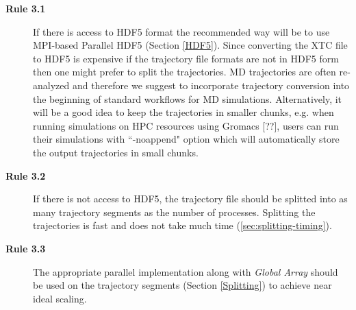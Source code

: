 \begin{description}
\begin{description}
  \item[\textbf{Rule 3.1}] If there is access to HDF5 format the recommended way will be to use MPI-based Parallel HDF5 (Section \ref{HDF5}). Since converting the XTC file to HDF5 is expensive if the trajectory file formats are not in HDF5 form then one might prefer to split the trajectories. MD trajectories are often re-analyzed and therefore we suggest to incorporate trajectory conversion into the beginning of standard workflows for MD simulations. 
 Alternatively, it will be a good idea to keep the trajectories in smaller chunks, e.g. when running simulations on HPC resources using Gromacs [??], users can run their simulations with ``-noappend" option which will automatically store the output trajectories in small chunks.
  \item[\textbf{Rule 3.2}] If there is not access to HDF5, the trajectory file should be splitted into as many trajectory segments as the number of processes. Splitting the trajectories is fast and does not take much time (\ref{sec:splitting-timing}).
  \item[\textbf{Rule 3.3}] The appropriate parallel implementation along with \emph{Global Array} should be used on the trajectory segments (Section \ref{Splitting}) to achieve near ideal scaling.
\end{description}
\end{description}
